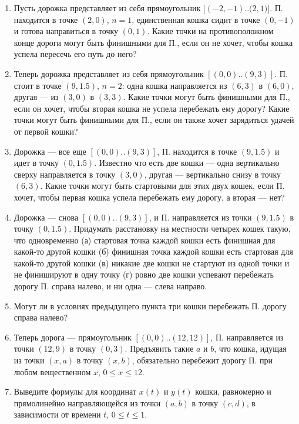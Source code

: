 \begin{enumerate}

\item Пусть дорожка представляет из себя прямоугольник $[(-2,-1)..(2,$\linebreak $1)]$. П. находится в точке $(2,0)$, $n=1$, единственная кошка сидит в точке $(0,-1)$ и готова направиться в точку $(0,1)$. Какие точки на противоположном конце дороги могут быть финишными для П., если он не хочет, чтобы кошка успела пересечь его путь до него?

\item Теперь дорожка представляет из себя прямоугольник $[(0,0)..(9,3)]$. П. стоит в точке $(9,1.5)$, $n=2$: одна кошка направляется из $(6,3)$ в $(6,0)$, другая — из $(3,0)$ в $(3,3)$. Какие точки могут быть финишными для П., если он хочет, чтобы вторая кошка не успела перебежать ему дорогу? Какие точки могут быть финишными для П., если он также хочет зарядиться удачей от первой кошки?

\item Дорожка — все еще $[(0,0)..(9,3)]$, П. находится в точке $(9,1.5)$ и идет в точку $(0,1.5)$. Известно что есть две кошки — одна вертикально сверху направляется в точку $(3,0)$, другая --- вертикально снизу в точку $(6,3)$. Какие точки могут быть стартовыми для этих двух кошек, если П. хочет, чтобы первая кошка успела перебежать ему дорогу, а вторая --- нет?

\item Дорожка — снова $[(0,0)..(9,3)]$, и П. направляется из точки $(9,1.5)$ в точку $(0,1.5)$. Придумать расстановку на местности четырех кошек такую, что одновременно (а) стартовая точка каждой кошки есть финишная для какой-то другой кошки (б) финишная точка каждой кошки есть стартовая для какой-то другой кошки (в) никакие две кошки не стартуют из одной точки и не финишируют в одну точку (г) ровно две кошки успевают перебежать дорогу П. справа налево, и ни одна — слева направо.

\item Могут ли в условиях предыдущего пункта три кошки перебежать П. дорогу справа налево?

\item Теперь дорога — прямоугольник $[(0,0)..(12,12)]$, П. направляется из точки $(12,9)$ в точку $(0,3)$. Предъявить такие $a$ и $b$, что кошка, идущая из точки $(x,a)$ в точку $(x,b)$, обязательно перебежит дорогу П. при любом вещественном $x$, $0 \leq x \leq 12$.

\item Выведите формулы для координат $x(t)$ и $y(t)$ кошки, равномерно и прямолинейно направляющейся из точки $(a,b)$ в точку $(c,d)$, в зависимости от времени $t$, $0 \leq t \leq 1$.

\end{enumerate}